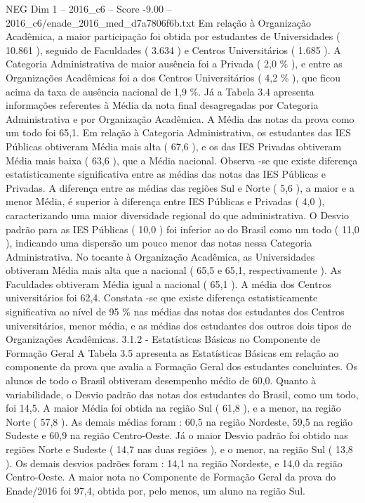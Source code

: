 \begin{textsample}{NEG Dim 1 – 2016\_c6 – Score -9.00 – 2016\_c6/enade\_2016\_med\_d7a7806f6b.txt}
Em relação à Organização Acadêmica, a maior participação foi obtida por estudantes de Universidades ( 10.861 ), seguido de Faculdades ( 3.634 ) e Centros Universitários ( 1.685 ).
A Categoria Administrativa de maior ausência foi a Privada ( 2,0 \% ), e entre as Organizações Acadêmicas foi a dos Centros Universitários ( 4,2 \% ), que ficou acima da taxa de ausência nacional de 1,9 \%.
Já a Tabela 3.4 apresenta informações referentes à Média da nota final desagregadas por Categoria Administrativa e por Organização Acadêmica.
A Média das notas da prova como um todo foi 65,1.
Em relação à Categoria Administrativa, os estudantes das IES Públicas obtiveram Média mais alta ( 67,6 ), e os das IES Privadas obtiveram Média mais baixa ( 63,6 ), que a Média nacional.
Observa -se que existe diferença estatisticamente significativa entre as médias das notas das IES Públicas e Privadas.
A diferença entre as médias das regiões Sul e Norte ( 5,6 ), a maior e a menor Média, é superior à diferença entre IES Públicas e Privadas ( 4,0 ), caracterizando uma maior diversidade regional do que administrativa.
O Desvio padrão para as IES Públicas ( 10,0 ) foi inferior ao do Brasil como um todo ( 11,0 ), indicando uma dispersão um pouco menor das notas nessa Categoria Administrativa.
No tocante à Organização Acadêmica, as Universidades obtiveram Média mais alta que a nacional ( 65,5 e 65,1, respectivamente ).
As Faculdades obtiveram Média igual a nacional ( 65,1 ).
A média dos Centros universitários foi 62,4.
Constata -se que existe diferença estatisticamente significativa ao nível de 95 \% nas médias das notas dos estudantes dos Centros universitários, menor média, e as médias dos estudantes dos outros dois tipos de Organizações Acadêmicas. 3.1.2 - Estatísticas Básicas no Componente de Formação Geral A Tabela 3.5 apresenta as Estatísticas Básicas em relação ao componente da prova que avalia a Formação Geral dos estudantes concluintes.
Os alunos de todo o Brasil obtiveram desempenho médio de 60,0.
Quanto à variabilidade, o Desvio padrão das notas dos estudantes do Brasil, como um todo, foi 14,5.
A maior Média foi obtida na região Sul ( 61,8 ), e a menor, na região Norte ( 57,8 ).
As demais médias foram : 60,5 na região Nordeste, 59,5 na região Sudeste e 60,9 na região Centro-Oeste.
Já o maior Desvio padrão foi obtido nas regiões Norte e Sudeste ( 14,7 nas duas regiões ), e o menor, na região Sul ( 13,8 ).
Os demais desvios padrões foram : 14,1 na região Nordeste, e 14,0 da região Centro-Oeste.
A maior nota no Componente de Formação Geral da prova do Enade/2016 foi 97,4, obtida por, pelo menos, um aluno na região Sul.

\end{textsample}
